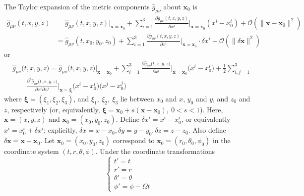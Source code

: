 \documentclass[english]{article}
\begin{document}
The Taylor expansion of the metric components $\hat{g}_{\mu\nu}$
about $\boldsymbol{x}_{0}$ is 
\begin{align*}
\hat{g}_{\mu\nu}\left(t,x,y,z\right) & =\hat{g}_{\mu\nu}\left(t,x,y,z\right)\big|_{\boldsymbol{x}=\boldsymbol{x}_{0}}+\sum^{3}_{i=1}\frac{\partial\hat{g}_{\mu\nu}\left(t,x,y,z\right)}{\partial x^{i}}\Bigg|_{\boldsymbol{x}=\boldsymbol{x}_{0}}\left(x^{i}-x^{i}_{0}\right)+\mathcal{O}\left(\|\boldsymbol{x}-\boldsymbol{x}_{0}\|^{2}\right)\\
 & =\hat{g}_{\mu\nu}\left(t,x_{0},y_{0},z_{0}\right)+\sum^{3}_{i=1}\frac{\partial\hat{g}_{\mu\nu}\left(t,x,y,z\right)}{\partial x^{i}}\Bigg|_{\boldsymbol{x}=\boldsymbol{x}_{0}}\cdot\delta x^{i}+\mathcal{O}\left(\|\delta\boldsymbol{x}\|^{2}\right)
\end{align*}
 or 
\begin{align*}
 & \hat{g}_{\mu\nu}\biggl(t,x,y,z\biggr)=\hat{g}_{\mu\nu}\biggl(t,x,y,z\biggr)\big|_{\boldsymbol{x}=\boldsymbol{x}_{0}}+\sum^{3}_{i=1}\frac{\partial\hat{g}_{\mu\nu}\biggl(t,x,y,z\biggr)}{\partial x^{i}}\Bigg|_{\boldsymbol{x}=\boldsymbol{x}_{0}}\biggl(x^{i}-x^{i}_{0}\biggr)+\frac{1}{2}\sum^{3}_{i,j=1}\\
 & \qquad\frac{\partial^{2}\hat{g}_{\mu\nu}\biggl(t,x,y,z\biggr)}{\partial x^{i}\partial x^{j}}\Bigg|_{\boldsymbol{x}=\boldsymbol{\xi}}\biggl(x^{i}-x^{i}_{0}\biggr)\biggl(x^{j}-x^{j}_{0}\biggr)
\end{align*}
 where $\boldsymbol{\xi}=\left(\xi_{1},\xi_{2},\xi_{3}\right)$, and
$\xi_{1},\ \xi_{2},\ \xi_{3}$ lie between $x_{0}$ and $x$, $y_{0}$
and $y$, and $z_{0}$ and $z$, respectively (or, equivalently, $\boldsymbol{\xi}=\boldsymbol{x}_{0}+s\left(\boldsymbol{x}-\boldsymbol{x}_{0}\right),\ 0<s<1$).
Here, $\boldsymbol{x}=\left(x,y,z\right)$ and $\boldsymbol{x}_{0}=\left(x_{0},y_{0},z_{0}\right)$.
Define $\delta x^{i}=x^{i}-x^{i}_{0}$, or equivalently $x^{i}=x^{i}_{0}+\delta x^{i}$;
explicitly, $\delta x=x-x_{0},\delta y=y-y_{0},\delta z=z-z_{0}$.
Also define $\delta\boldsymbol{x}=\boldsymbol{x}-\boldsymbol{x}_{0}$.
Let $\boldsymbol{x}_{0}=\left(x_{0},y_{0},z_{0}\right)$ correspond
to $\boldsymbol{x}_{0}=\left(r_{0},\theta_{0},\phi_{0}\right)$ in
the coordinate system $\left(t,r,\theta,\phi\right)$. Under the coordinate
transformations 
\[
\begin{cases}
t'=t\\
r'=r\\
\theta'=\theta\\
\phi'=\phi-\Omega t
\end{cases}
\]
\end{document}
